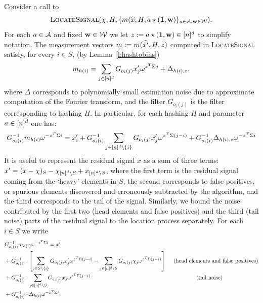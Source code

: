 Consider a call to 
$$
\Call{LocateSignal}{\chi, H, \{m(\wh{x}, H, a\star (\one, \h)\}_{a\in \A, \h\in \H}}.
$$ 
For each $a\in {\mathcal{A}}$ and fixed $\mathbf{w}\in \mathcal{W}$ we let $z:=a\star (\mathbf{1}, \mathbf{w})\in {[n]^d}$ to simplify notation. The measurement vectors $m:=m(\widehat{x'}, H, z)$  computed in \textsc{LocateSignal} satisfy, for every $i\in S$,  (by Lemma~\ref{l:hashtobins})
  \[
  m_{h(i)}  = \sum_{j\in {[n]^d}} G_{o_i(j)}x'_j \omega^{z^T \Sigma j}+\Delta_{h(i), z},
  \]
where $\Delta$ corresponds to polynomially small estimation noise due to approximate computation of the Fourier transform, and the filter $G_{o_i(j)}$ is the filter corresponding to hashing $H$. In particular, for each hashing $H$ and  parameter $a\in {[n]^d}$ one has:
\begin{equation*}
\begin{split}
G_{o_i(i)}^{-1}m_{h(i)} \omega^{-z^T \Sigma i} = x'_i + G_{o_i(i)}^{-1}\sum_{j\in {[n]^d}\setminus \{i\}} G_{o_i(j)}x'_j \omega^{z^T \Sigma (j-i)}+G_{o_i(i)}^{-1}\Delta_{h(i), z}\omega^{-z^T \Sigma i}
\end{split}
\end{equation*}
It is useful to represent the residual signal $x$ as a sum of three terms: $x'=(x-\chi)_S-\chi_{{[n]^d}\setminus S}+x_{{[n]^d}\setminus S}$, where the first term is the residual signal coming from the `heavy' elements in $S$, the second corresponds to false positives, or spurious elements discovered and erroneously subtracted by the algorithm, and the third corresponds to the tail of the signal. Similarly, we bound the noise contributed by the first two (head elements and false positives) and the third (tail noise) parts of the residual signal to the location process separately. For each $i\in S$ we write
\begin{equation}\label{eq:uexp1}
\begin{split}
&G_{o_i(i)}^{-1}m_{h(i)}\omega^{-z^T \Sigma i}=x'_i \\
&+G_{o_i(i)}^{-1}\cdot \left[\sum_{j\in S\setminus \{i\}} G_{o_i(j)}x'_j \omega^{z^T \Sigma (j-i)}-\sum_{j\in {[n]^d}\setminus S} G_{o_i(j)}\chi_j \omega^{z^T \Sigma (j-i)}\right]\text{~~~~(head elements and false positives)}\\
 &+G_{o_i(i)}^{-1}\cdot \sum_{j\in {[n]^d}\setminus S} G_{o_i(j)}x_j \omega^{z^T \Sigma (j-i)}\text{~~~~~~~~~~~~~~~~~~~~~~~~~~~~~~~~~~~~~~~~~~~~~~~~~~~~~~~~~(tail noise)}\\
&+G_{o_i(i)}^{-1}\cdot \Delta_{h(i)}\omega^{-z^T \Sigma i}.
\end{split}
\end{equation}

